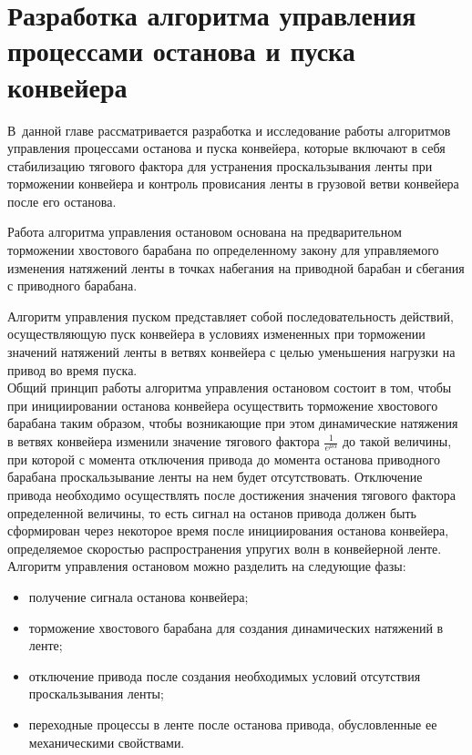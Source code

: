 
\chapter{Разработка алгоритма управления процессами останова и пуска конвейера} \label{chapt4}
В~данной главе рассматривается разработка и исследование работы алгоритмов управления процессами останова и пуска конвейера, которые включают в себя стабилизацию тягового фактора для устранения проскальзывания ленты при торможении конвейера и контроль провисания ленты в грузовой ветви конвейера после его останова.

Работа алгоритма управления остановом основана на предварительном торможении хвостового барабана по определенному закону для управляемого изменения натяжений ленты в точках набегания на приводной барабан и сбегания с приводного барабана. 

Алгоритм управления пуском представляет собой последовательность действий, осуществляющую пуск конвейера в условиях измененных при торможении значений натяжений ленты в ветвях конвейера с целью уменьшения нагрузки на привод во время пуска.\\

Общий принцип работы алгоритма управления остановом состоит в том, чтобы при инициировании останова конвейера осуществить торможение хвостового барабана таким образом, чтобы возникающие при этом динамические натяжения в ветвях конвейера изменили значение тягового фактора $ \frac{1}{e^{\mu\alpha}} $ до такой величины, при которой с момента отключения привода до момента останова приводного барабана проскальзывание ленты на нем будет отсутствовать. Отключение привода необходимо осуществлять после достижения значения тягового фактора определенной величины, то есть сигнал на останов привода должен быть сформирован через некоторое время после инициирования останова конвейера, определяемое скоростью распространения упругих волн в конвейерной ленте.\\

Алгоритм управления остановом можно разделить на следующие фазы:
\begin{itemize}
\item получение сигнала останова конвейера;
\item торможение хвостового барабана для создания динамических натяжений в ленте;
\item отключение привода после создания необходимых условий отсутствия проскальзывания ленты;
\item переходные процессы в ленте после останова привода, обусловленные ее механическими свойствами.\\
\end{itemize}

